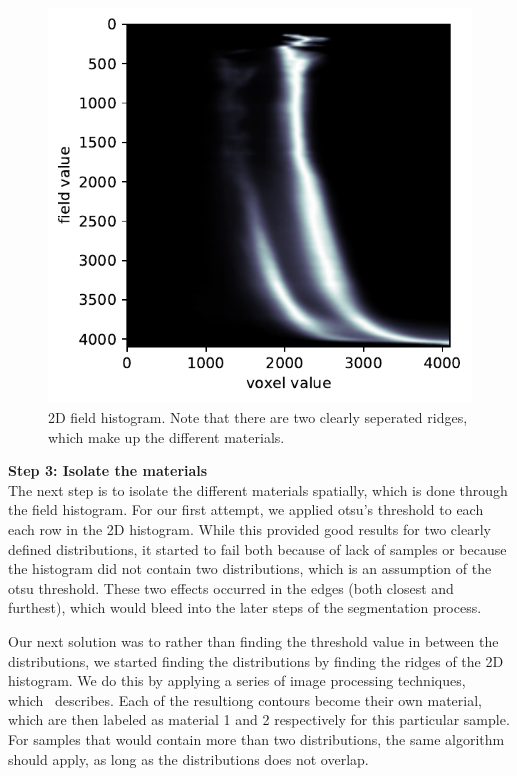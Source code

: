 \begin{figure}
    \includegraphics[width=\linewidth]{figures/fb-gauss+edt-bone_region3.pdf}
    \caption{2D field histogram. Note that there are two clearly seperated ridges, which make up the different materials.}
    \label{fig:field-hist}
\end{figure}

\vspace{\baselineskip}
\noindent\textbf{Step 3: Isolate the materials} \\
The next step is to isolate the different materials spatially, which is done through the field histogram.
For our first attempt, we applied otsu's threshold to each each row in the 2D histogram. 
While this provided good results for two clearly defined distributions, it started to fail both because of lack of samples or because the histogram did not contain two distributions, which is an assumption of the otsu threshold. 
These two effects occurred in the edges (both closest and furthest), which would bleed into the later steps of the segmentation process. 

Our next solution was to rather than finding the threshold value in between the distributions, we started finding the distributions by finding the ridges of the 2D histogram. 
We do this by applying a series of image processing techniques, which~ describes.
Each of the resultiong contours become their own material, which are then labeled as material 1 and 2 respectively for this particular sample. For samples that would contain more than two distributions, the same algorithm should apply, as long as the distributions does not overlap. 

